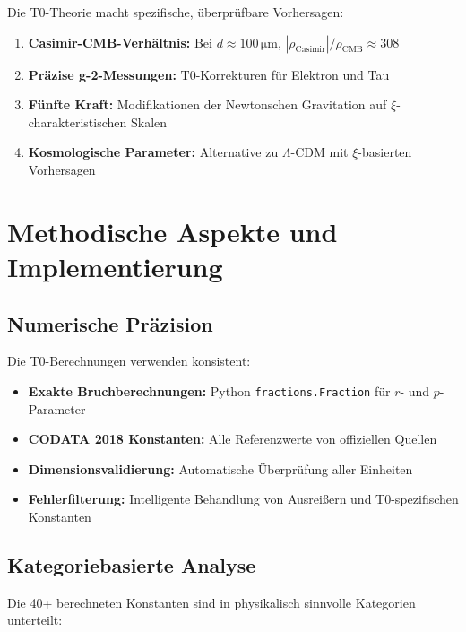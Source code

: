 \documentclass[12pt,a4paper]{report}
\begin{document}
	Die T0-Theorie macht spezifische, überprüfbare Vorhersagen:
	
	\begin{enumerate}
		\item \textbf{Casimir-CMB-Verhältnis:} Bei $d \approx 100\,\si{\micro\meter}$, $|\rho_{\text{Casimir}}|/\rho_{\text{CMB}} \approx 308$
		\item \textbf{Präzise g-2-Messungen:} T0-Korrekturen für Elektron und Tau
		\item \textbf{Fünfte Kraft:} Modifikationen der Newtonschen Gravitation auf $\xi$-charakteristischen Skalen
		\item \textbf{Kosmologische Parameter:} Alternative zu $\Lambda$-CDM mit $\xi$-basierten Vorhersagen
	\end{enumerate}
	
	\section{Methodische Aspekte und Implementierung}
	
	\subsection{Numerische Präzision}
	
	Die T0-Berechnungen verwenden konsistent:
	
	\begin{itemize}
		\item \textbf{Exakte Bruchberechnungen:} Python \texttt{fractions.Fraction} für $r$- und $p$-Parameter
		\item \textbf{CODATA 2018 Konstanten:} Alle Referenzwerte von offiziellen Quellen
		\item \textbf{Dimensionsvalidierung:} Automatische Überprüfung aller Einheiten
		\item \textbf{Fehlerfilterung:} Intelligente Behandlung von Ausreißern und T0-spezifischen Konstanten
	\end{itemize}
	
	\subsection{Kategoriebasierte Analyse}
	
	Die 40+ berechneten Konstanten sind in physikalisch sinnvolle Kategorien unterteilt:
	
\end{document}
